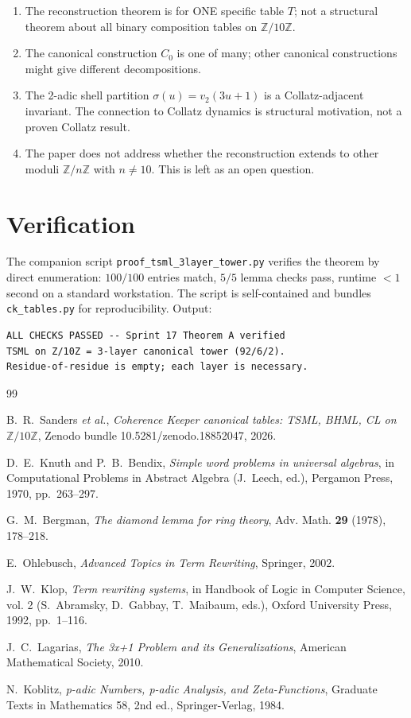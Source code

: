 \documentclass[11pt,reqno]{amsart}
\theoremstyle{plain}
\theoremstyle{definition}
\begin{document}
\begin{enumerate}
\item The reconstruction theorem is for ONE specific table $T$;
not a structural theorem about all binary composition tables on
$\mathbb{Z}/10\mathbb{Z}$.
\item The canonical construction $C_0$ is one of many; other
canonical constructions might give different decompositions.
\item The 2-adic shell partition $\sigma(u) = v_2(3u + 1)$ is a
Collatz-adjacent invariant. The connection to Collatz dynamics is
structural motivation, not a proven Collatz result.
\item The paper does not address whether the reconstruction extends
to other moduli $\mathbb{Z}/n\mathbb{Z}$ with $n \neq 10$. This is
left as an open question.
\end{enumerate}

\section{Verification}

The companion script \texttt{proof\_tsml\_3layer\_tower.py} verifies
the theorem by direct enumeration: $100/100$ entries match, $5/5$
lemma checks pass, runtime $< 1$ second on a standard workstation.
The script is self-contained and bundles \texttt{ck\_tables.py} for
reproducibility. Output:

\begin{verbatim}
ALL CHECKS PASSED -- Sprint 17 Theorem A verified
TSML on Z/10Z = 3-layer canonical tower (92/6/2).
Residue-of-residue is empty; each layer is necessary.
\end{verbatim}

\begin{thebibliography}{99}

B.~R.~Sanders \emph{et al.},
\emph{Coherence Keeper canonical tables: TSML, BHML, CL on
$\mathbb{Z}/10\mathbb{Z}$},
Zenodo bundle 10.5281/zenodo.18852047, 2026.

D.~E.~Knuth and P.~B.~Bendix,
\emph{Simple word problems in universal algebras},
in Computational Problems in Abstract Algebra (J.~Leech, ed.),
Pergamon Press, 1970, pp.~263--297.

G.~M.~Bergman,
\emph{The diamond lemma for ring theory},
Adv. Math. \textbf{29} (1978), 178--218.

E.~Ohlebusch,
\emph{Advanced Topics in Term Rewriting},
Springer, 2002.

J.~W.~Klop,
\emph{Term rewriting systems},
in Handbook of Logic in Computer Science, vol. 2 (S.~Abramsky,
D.~Gabbay, T.~Maibaum, eds.), Oxford University Press, 1992,
pp.~1--116.

J.~C.~Lagarias,
\emph{The 3x+1 Problem and its Generalizations},
American Mathematical Society, 2010.

N.~Koblitz,
\emph{p-adic Numbers, p-adic Analysis, and Zeta-Functions},
Graduate Texts in Mathematics 58, 2nd ed., Springer-Verlag, 1984.

\end{thebibliography}
\end{document}
